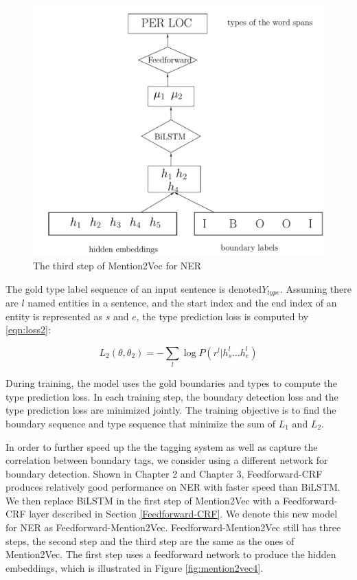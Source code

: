 \documentclass{sfuthesis}
\begin{document}
\begin{figure}
  \centering
  \includegraphics[scale=0.6]{mention2vec3.pdf}
 \caption{The third step of Mention2Vec for NER}
  \label{fig:mention2vec3}
\end{figure}

The gold type label sequence of an input sentence is denoted$Y_{type}$. Assuming there are $l$ named entities in a sentence, and the start index and the end index of an entity is represented as $s$ and $e$, the type prediction loss is computed by \ref{eqn:loss2}:

\begin{equation}\label{eqn:loss2}
  L_{2}\left( \theta ,\theta _{2}\right) =-\sum _{l}\log P\left( r^{l}|h_{s}^{l}{\ldots }h_{e}^{l}\right)
\end{equation}

During training, the model uses the gold boundaries and types to compute the type prediction loss. In each training step, the boundary detection loss and the type prediction loss are minimized jointly. The training objective is to find the boundary sequence and type sequence that minimize the sum of $L_{1}$ and $L_{2}$.


In order to further speed up the the tagging system as well as capture the correlation between boundary tags, we consider using a different network for boundary detection. Shown in Chapter 2 and Chapter 3, Feedforward-CRF produces relatively good performance on NER with faster speed than BiLSTM. We then replace BiLSTM in the first step of Mention2Vec with a Feedforward-CRF layer described in Section \ref{Feedforward-CRF}. We denote this new model for NER as Feedforward-Mention2Vec. Feedforward-Mention2Vec still has three steps, the second step and the third step are the same as the ones of Mention2Vec. The first step uses a feedforward network to produce the hidden embeddings, which is illustrated in Figure \ref{fig:mention2vec4}.
\end{document}
